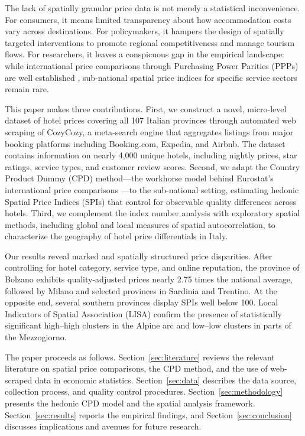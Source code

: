 \documentclass[12pt,a4paper]{article}
\begin{document}
The lack of spatially granular price data is not merely a statistical inconvenience. For consumers, it means limited transparency about how accommodation costs vary across destinations. For policymakers, it hampers the design of spatially targeted interventions to promote regional competitiveness and manage tourism flows. For researchers, it leaves a conspicuous gap in the empirical landscape: while international price comparisons through Purchasing Power Parities (PPPs) are well established \citep{eurostat_oecd2012}, sub-national spatial price indices for specific service sectors remain rare.

This paper makes three contributions. First, we construct a novel, micro-level dataset of hotel prices covering all 107 Italian provinces through automated web scraping of CozyCozy, a meta-search engine that aggregates listings from major booking platforms including Booking.com, Expedia, and Airbnb. The dataset contains information on nearly 4{,}000 unique hotels, including nightly prices, star ratings, service types, and customer review scores. Second, we adapt the Country Product Dummy (CPD) method---the workhorse model behind Eurostat's international price comparisons \citep{rao2005equivalence}---to the sub-national setting, estimating hedonic Spatial Price Indices (SPIs) that control for observable quality differences across hotels. Third, we complement the index number analysis with exploratory spatial methods, including global and local measures of spatial autocorrelation, to characterize the geography of hotel price differentials in Italy.

Our results reveal marked and spatially structured price disparities. After controlling for hotel category, service type, and online reputation, the province of Bolzano exhibits quality-adjusted prices nearly 2.75 times the national average, followed by Milano and selected provinces in Sardinia and Trentino. At the opposite end, several southern provinces display SPIs well below 100. Local Indicators of Spatial Association (LISA) confirm the presence of statistically significant high--high clusters in the Alpine arc and low--low clusters in parts of the Mezzogiorno.

The paper proceeds as follows. Section~\ref{sec:literature} reviews the relevant literature on spatial price comparisons, the CPD method, and the use of web-scraped data in economic statistics. Section~\ref{sec:data} describes the data source, collection process, and quality control procedures. Section~\ref{sec:methodology} presents the hedonic CPD model and the spatial analysis framework. Section~\ref{sec:results} reports the empirical findings, and Section~\ref{sec:conclusion} discusses implications and avenues for future research.
\end{document}
